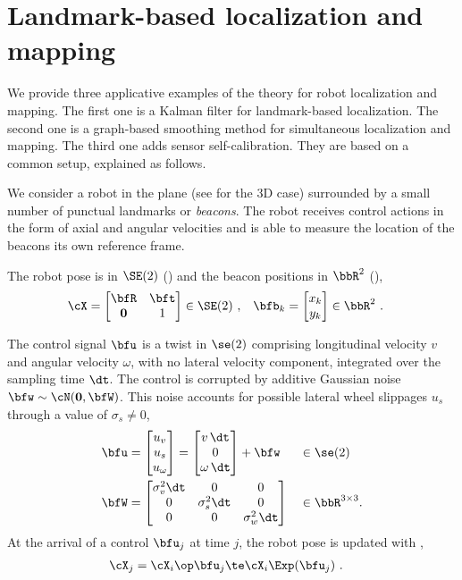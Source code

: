 
\newcommand{\dx}{{\delta\bfx}}

\section{Landmark-based localization and mapping}
\label{sec:SLAM}

We provide three applicative examples of the theory for robot localization and mapping. 
The first one is a Kalman filter for landmark-based localization.
The second one is a graph-based smoothing method for simultaneous localization and mapping.
The third one adds sensor self-calibration.
They are based on a common setup, explained as follows.

We consider a robot in the plane
(see  for the 3D case)
surrounded by a small number of punctual landmarks or \emph{beacons}. 
The robot receives control actions in the form of axial and angular velocities and is able to measure the location of the beacons \wrt its own reference frame.


The robot pose is in $\SE(2)$ () and the beacon positions in $\bbR^2$ (),
%
\begin{align*}
\cX &= 
\begin{bmatrix}
\bfR & \bft \\ \bf0 & 1
\end{bmatrix}\in\SE(2)
~,
&
\bfb_k &= \begin{bmatrix}
x_k \\ y_k
\end{bmatrix}\in\bbR^2
~.
\end{align*}

The control signal $\bfu$ is a twist in $\se(2)$ comprising longitudinal velocity $v$ and angular velocity $\omega$, with no lateral velocity component, integrated over the sampling time $\dt$. 
The control is corrupted by additive Gaussian noise $\bfw\sim\cN(\bf0,\bfW)$.
This noise accounts for possible lateral wheel slippages $u_s$ through a value of $\sigma_s\ne0$, 
%
\begin{align}
\bfu &
= \begin{bmatrix} u_v \\ u_s \\ u_\omega \end{bmatrix} 
= \begin{bmatrix} v\,\dt \\ 0 \\ \omega\,\dt \end{bmatrix}+\bfw  
&&\in\se(2)
\\
\bfW &= \begin{bmatrix}
\sigma_v^2\dt &0&0 \\ 0&\sigma_s^2\dt&0 \\ 0&0&\sigma_w^2\dt
\end{bmatrix} &&\in\bbR^{3\times3}.
\end{align}
%
At the arrival of a control $\bfu_j$ at time $j$, the robot pose is updated with ,
%
\begin{align}\label{equ:motion}
\cX_j &= \cX_i \op \bfu_j \te \cX_i \Exp(\bfu_j)
~.
\end{align}


